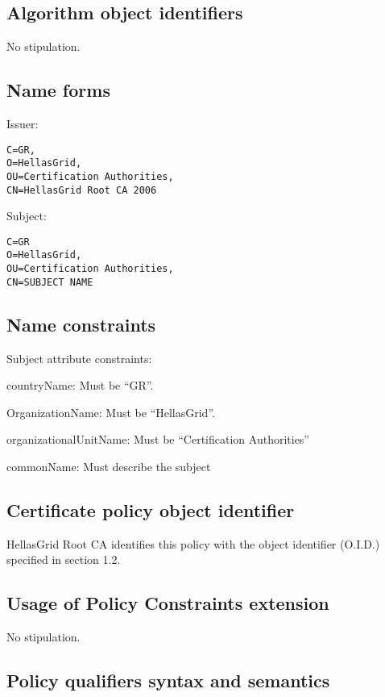 \documentclass[11pt,a4paper,titlepage]{book}
\begin{document}
\subsection{Algorithm object identifiers}

No stipulation.

\subsection{Name forms}

Issuer:

\begin{verbatim}
C=GR,
O=HellasGrid,
OU=Certification Authorities,
CN=HellasGrid Root CA 2006
\end{verbatim}

Subject:

\begin{verbatim}
C=GR
O=HellasGrid,
OU=Certification Authorities,
CN=SUBJECT NAME
\end{verbatim}

\subsection{Name constraints}

Subject attribute constraints:

countryName:
Must be “GR”.

OrganizationName:
Must be “HellasGrid”.

organizationalUnitName:
Must be “Certification Authorities”

commonName:
Must describe the subject


\subsection{Certificate policy object identifier}

HellasGrid Root CA identifies this policy with the object identifier (O.I.D.) specified in section 1.2.

\subsection{Usage of Policy Constraints extension}

No stipulation.

\subsection{Policy qualifiers syntax and semantics}
\end{document}
